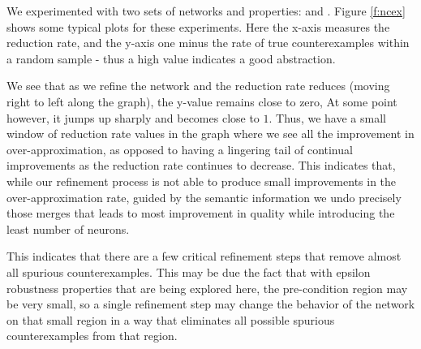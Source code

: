 We experimented with two sets of networks and properties: \mnist and \acasxu.
Figure \ref{f:ncex} shows some typical plots
for these experiments. Here the x-axis measures the reduction rate, and the
y-axis one minus the rate of true counterexamples within a random sample - thus
a high value indicates a good abstraction.

 We see that as we refine the
network and the reduction rate reduces (moving right to left along the graph),
the y-value remains close to zero, At some point however, it jumps up
sharply and becomes close to $1$. Thus, we have a small window of reduction rate
values in the graph where we see all the improvement in over-approximation, as
opposed to having a lingering tail of continual improvements as the reduction
rate continues to decrease.
This indicates that, while our refinement process is not able to produce small
improvements in the over-approximation rate, guided by the semantic information
we undo precisely those merges that leads to most improvement in quality while
introducing the least number of neurons.

This indicates that there are a few
critical refinement steps that remove almost all spurious counterexamples. This
may be due the fact that with epsilon robustness properties that are being
explored here, the pre-condition region may be very small, so a single
refinement step may change the behavior of the network on that small region in a
way that eliminates all possible spurious counterexamples from that region.

